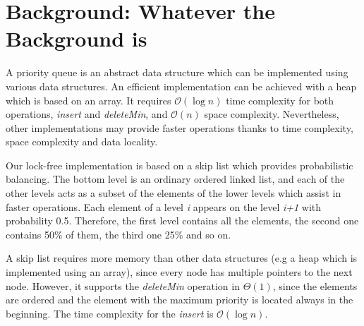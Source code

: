 \section{Background: Whatever the Background is}\label{sec:background}

A priority queue is an abstract data structure which can be implemented using various data structures.
An efficient implementation can be achieved with a heap which is based on an array.
It requires $\mathcal{O}(\log{}n)$ time complexity for both operations, \textit{insert} and \textit{deleteMin}, and $\mathcal{O}(n)$ space complexity.
Nevertheless, other implementations may provide faster operations thanks to time complexity, space complexity and data locality.

Our lock-free implementation is based on a skip list which provides probabilistic balancing.
The bottom level is an ordinary ordered linked list, and each of the other levels acts as a subset of the elements of the lower levels which assist in faster operations.
Each element of a level \textit{i} appears on the level \textit{i+1} with probability 0.5.
Therefore, the first level contains all the elements, the second one contains 50\% of them, the third one 25\% and so on.

A skip list requires more memory than other data structures (e.g a heap which is implemented using an array), since every node has multiple pointers to the next node.
However, it supports the \textit{deleteMin} operation in $\Theta(1)$, since the elements are ordered and the element with the maximum priority is located always in the beginning.
The time complexity for the \textit{insert} is $\mathcal{O}(\log{}n)$.






